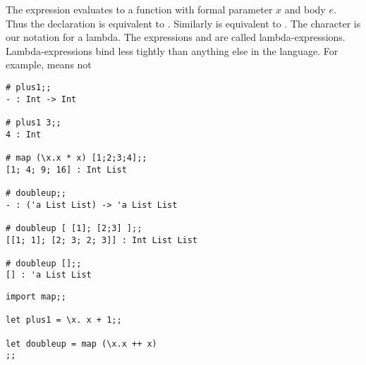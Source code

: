 \documentclass[11pt]{article}
\begin{document}
The expression  evaluates to a
function with formal parameter $x$ and body $e$. Thus the declaration  is equivalent to .  Similarly  is equivalent to .
The character {\bs} is our notation for a lambda.  The expressions
and  are called lambda-expressions.
Lambda-expressions bind less tightly than anything else in the language.  For
example,  means
 not

\begin{session}
\emlsession
\begin{verbatim}
# plus1;;
- : Int -> Int

# plus1 3;;
4 : Int

# map (\x.x * x) [1;2;3;4];;
[1; 4; 9; 16] : Int List

# doubleup;;
- : ('a List List) -> 'a List List

# doubleup [ [1]; [2;3] ];;
[[1; 1]; [2; 3; 2; 3]] : Int List List

# doubleup [];;
[] : 'a List List
\end{verbatim}
\emlfile
\begin{verbatim}
import map;;

let plus1 = \x. x + 1;;

let doubleup = map (\x.x ++ x)
;;
\end{verbatim}
\emlend
\end{session}




\end{document}
